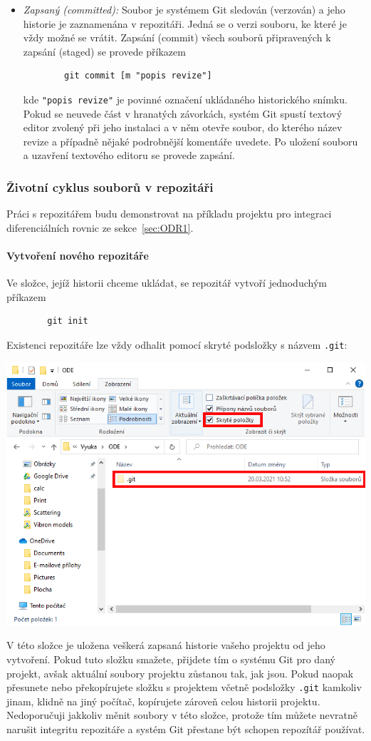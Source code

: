 \documentclass[a4paper,11pt,twoside]{article}
\newcommand{\subsubsubsection}[1]{\paragraph{#1}\mbox{}

}
\def\code#1{\textnormal{\texttt{#1}}}
\theoremstyle{red}
\theoremstyle{green}
\begin{document}
\begin{itemize}
        \item \emph{Zapsaný (committed):} 
            Soubor je systémem Git sledován (verzován) a jeho historie je zaznamenána v repozitáři.
            Jedná se o verzi souboru, ke které je vždy možné se vrátit.
            Zapsání (commit) všech souborů připravených k zapsání (staged) se provede příkazem
            \begin{lstlisting}
        git commit [m "popis revize"]\end{lstlisting}
            kde \code{"popis revize"} je povinné označení ukládaného historického snímku.
            Pokud se neuvede část v hranatých závorkách, systém Git spustí textový editor zvolený při jeho instalaci a v něm otevře soubor, do kterého název revize a případně nějaké podrobnější komentáře uvedete.
            Po uložení souboru a uzavření textového editoru se provede zapsání.
    \end{itemize}

\subsubsection{Životní cyklus souborů v repozitáři}
Práci s repozitářem budu demonstrovat na příkladu projektu pro integraci diferenciálních rovnic ze sekce~\ref{sec:ODR1}.

\subsubsubsection{Vytvoření nového repozitáře}
    Ve složce, jejíž historii chceme ukládat, se repozitář vytvoří jednoduchým příkazem
    \begin{lstlisting}
        git init\end{lstlisting}
    Existenci repozitáře lze vždy odhalit pomocí skryté podsložky s názvem \code{.git}:
    \begin{center}\includegraphics[width=0.7\linewidth]{FolderGit.png}\end{center}
    V této složce je uložena veškerá zapsaná historie vašeho projektu od jeho vytvoření.
    Pokud tuto složku smažete, přijdete tím o  systému Git pro daný projekt, avšak aktuální soubory projektu zůstanou tak, jak jsou.
    Pokud naopak přesunete nebo překopírujete složku s projektem včetně podsložky \code{.git} kamkoliv jinam, klidně na jiný počítač, kopírujete zároveň celou historii projektu.
    Nedoporučuji jakkoliv měnit soubory v této složce, protože tím můžete nevratně narušit integritu repozitáře a systém Git přestane být schopen repozítář používat.
\end{document}
